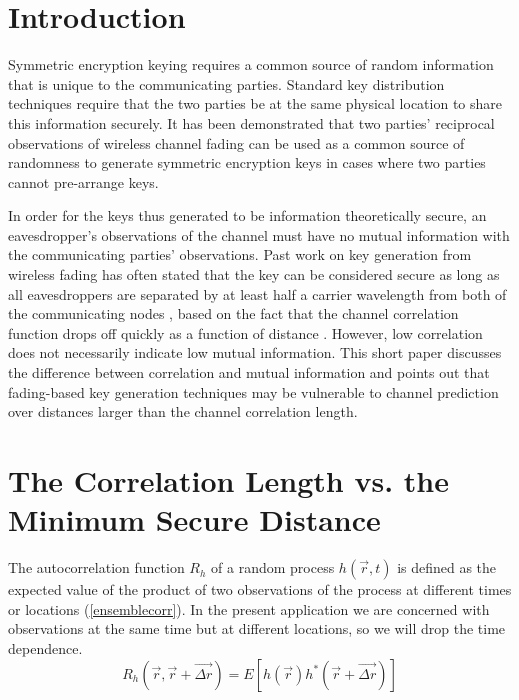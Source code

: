 \documentclass[conference]{ieeetran}
\begin{document}
\section{Introduction}
Symmetric encryption keying requires a common source of random information that is unique to the communicating parties. Standard key distribution techniques require that the two parties be at the same physical location to share this information securely.  
It has been demonstrated \cite{azimisadjadi2007, bloch2008, mathur2008, ye2010} that two parties' reciprocal observations of wireless channel fading can be used as a common source of randomness to generate symmetric encryption keys in cases where two parties cannot pre-arrange keys.  

In order for the keys thus generated to be information theoretically secure, an eavesdropper's observations of the channel must have no mutual information with the communicating parties' observations.  Past work on key generation from wireless fading has often stated that the key can be considered secure as long as all eavesdroppers are separated by at least half a carrier wavelength from both of the communicating nodes \cite{azimisadjadi2007, bloch2008, mathur2008, ye2010}, based on the fact that the channel correlation function drops off quickly as a function of distance \cite{jakes1974}.  However, low correlation does not necessarily indicate low mutual information.  This short paper discusses the difference between correlation and mutual information and points out that fading-based key generation techniques may be vulnerable to channel prediction \cite{duel-hallen2000, svantesson2003} over distances larger than the channel correlation length.

\section{The Correlation Length vs. the Minimum Secure Distance}\label{corrlen}
The autocorrelation function $R_h$ of a random process $h(\vec{r},t)$ is defined as the expected value of the product of two observations of the process at different times or locations (\ref{ensemblecorr}).  In the present application we are concerned with observations at the same time but at different locations, so we will drop the time dependence.
\begin{equation}\label{ensemblecorr}
R_h(\vec{r},\vec{r}+\vec{\Delta r}) = E[h(\vec{r})h^*(\vec{r}+\vec{\Delta r})]
\end{equation}
\end{document}
